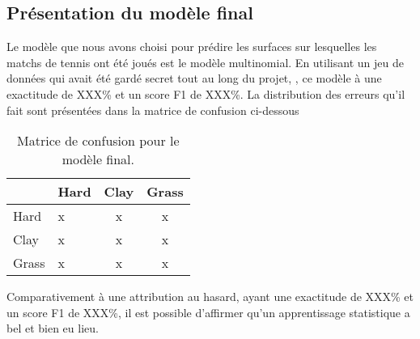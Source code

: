 \subsection{Présentation du modèle final}

Le modèle que nous avons choisi pour prédire les surfaces sur lesquelles les matchs de tennis ont été joués est le modèle multinomial. En utilisant un jeu de données qui avait été gardé secret tout au long du projet, , ce modèle à une exactitude de XXX\% et un score F1 de XXX\%. La distribution des erreurs qu'il fait sont présentées dans la matrice de confusion ci-dessous

\begin{table}[H]
	
	\caption{\label{tab:matrice_confusion}Matrice de confusion pour le modèle final.}
	\centering
	\begin{tabular}[t]{llcc}
		\hiderowcolors
		\toprule
		& Hard & Clay & Grass\\
		\midrule
		\showrowcolors
		Hard & x & x & x\\
		Clay & x & x & x\\
		Grass & x & x & x\\
		\bottomrule
	\end{tabular}
\end{table}

Comparativement à une attribution au hasard, ayant une exactitude de XXX\% et un score F1 de XXX\%, il est possible d'affirmer qu'un apprentissage statistique a bel et bien eu lieu. 